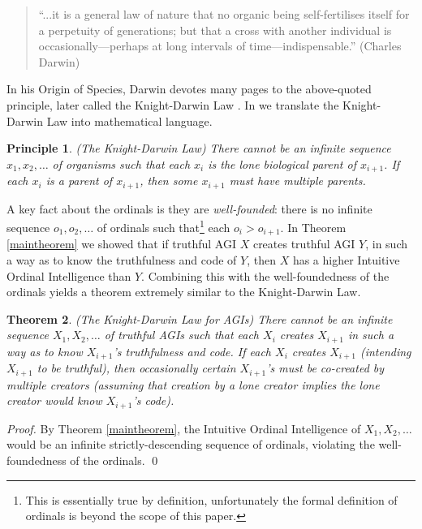 \documentclass[runningheads]{llncs}
\newtheorem{mytheorem}{Theorem}
\newtheorem{myprinciple}[mytheorem]{Principle}
\begin{document}
\begin{quote}
``...it is a general law of nature that no organic being self-fertilises itself
for a perpetuity of generations; but that a cross with another individual
is occasionally---perhaps at long intervals of time---indispensable.''
(Charles Darwin)
\end{quote}

In his Origin of Species, Darwin devotes many
pages to the above-quoted principle, later called the
Knight-Darwin Law \cite{darwin1898knight}. In \cite{alexander2013}
we translate
the Knight-Darwin Law into mathematical language.

\begin{myprinciple}
(The Knight-Darwin Law)
There cannot be an infinite sequence
$x_1,x_2,\ldots$ of organisms such that each $x_i$
is the lone biological parent of $x_{i+1}$.
If each $x_i$ is a parent of $x_{i+1}$, then some $x_{i+1}$
must have multiple parents.
\end{myprinciple}

A key fact about the ordinals is they
are \emph{well-founded}:
there is
no infinite sequence $o_1,o_2,\ldots$ of ordinals such that\footnote{This
is essentially true by definition,
unfortunately the formal definition of ordinals is beyond the scope of
this paper.} each
$o_i>o_{i+1}$. In Theorem \ref{maintheorem} we showed that if truthful
AGI $X$ creates truthful AGI $Y$, in such a way as to know the truthfulness
and code of $Y$, then $X$ has a higher Intuitive Ordinal Intelligence
than $Y$. Combining this with the well-foundedness of the ordinals yields
a theorem extremely similar to the Knight-Darwin Law.

\begin{mytheorem}
\label{maintheorem2}
(The Knight-Darwin Law for AGIs)
There cannot be an infinite sequence
$X_1,X_2,\ldots$ of truthful AGIs such that each $X_i$
creates $X_{i+1}$ in such a way as to know $X_{i+1}$'s truthfulness and code.
If each $X_i$ creates $X_{i+1}$ (intending $X_{i+1}$ to be truthful), then
occasionally certain $X_{i+1}$'s must be
co-created by multiple creators (assuming that creation by
a lone creator implies the lone creator would know $X_{i+1}$'s code).
\end{mytheorem}

\begin{proof}
By Theorem \ref{maintheorem}, the Intuitive Ordinal Intelligence of $X_1,X_2,\ldots$
would be an infinite strictly-descending sequence of ordinals, violating
the well-foundedness of the ordinals.
\qed
\end{proof}
\end{document}
